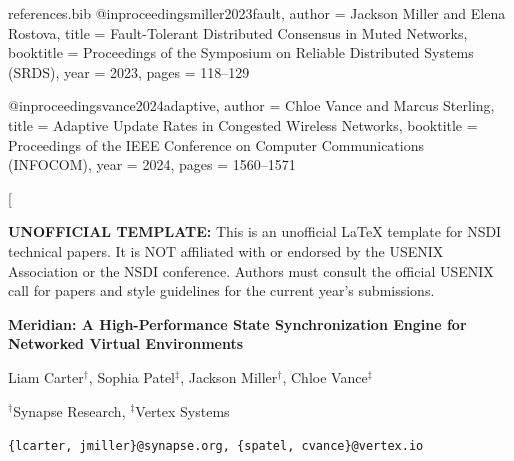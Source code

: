 \documentclass[10pt,twocolumn]{article}
\begin{document}
\begin{filecontents*}{references.bib}
@inproceedings{miller2023fault,
  author    = {Jackson Miller and Elena Rostova},
  title     = {Fault-Tolerant Distributed Consensus in Muted Networks},
  booktitle = {Proceedings of the Symposium on Reliable Distributed Systems (SRDS)},
  year      = {2023},
  pages     = {118--129}
}

@inproceedings{vance2024adaptive,
  author    = {Chloe Vance and Marcus Sterling},
  title     = {Adaptive Update Rates in Congested Wireless Networks},
  booktitle = {Proceedings of the IEEE Conference on Computer Communications (INFOCOM)},
  year      = {2024},
  pages     = {1560--1571}
}
\end{filecontents*}

\twocolumn[
  \begin{warningbox}
    \small\sffamily\color{black}
    \textbf{UNOFFICIAL TEMPLATE:} This is an unofficial LaTeX template for NSDI technical papers. It is NOT affiliated with or endorsed by the USENIX Association or the NSDI conference. Authors must consult the official USENIX call for papers and style guidelines for the current year's submissions.
  \end{warningbox}
  \vspace{1.5em}
  
  \begin{center}
    {\huge\bfseries\color{primary} Meridian: A High-Performance State Synchronization Engine for Networked Virtual Environments \par}
    \vspace{1.5em}
    {\large Liam Carter$^\dagger$, Sophia Patel$^\ddagger$, Jackson Miller$^\dagger$, Chloe Vance$^\ddagger$ \par}
    \vspace{0.8em}
    {\small $^\dagger$Synapse Research, $^\ddagger$Vertex Systems \par}
    {\small \texttt{\{lcarter, jmiller\}@synapse.org, \{spatel, cvance\}@vertex.io} \par}
    \vspace{1.5em}
  \end{center}
  
\end{document}
